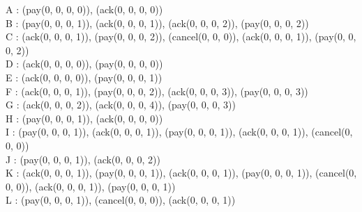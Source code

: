 \documentclass[a4paper]{article}
\begin{document}
\newpage
\noindent
A :  (pay(0, 0, 0, 0)), (ack(0, 0, 0, 0)) \\
B :  (pay(0, 0, 0, 1)), (ack(0, 0, 0, 1)), (ack(0, 0, 0, 2)), (pay(0, 0, 0, 2))\\
C :  (ack(0, 0, 0, 1)), (pay(0, 0, 0, 2)), (cancel(0, 0, 0)), (ack(0, 0, 0, 1)), (pay(0, 0, 0, 2))\\
D :  (ack(0, 0, 0, 0)), (pay(0, 0, 0, 0))\\
E :  (ack(0, 0, 0, 0)), (pay(0, 0, 0, 1))\\
F :  (ack(0, 0, 0, 1)), (pay(0, 0, 0, 2)), (ack(0, 0, 0, 3)), (pay(0, 0, 0, 3))\\
G :  (ack(0, 0, 0, 2)), (ack(0, 0, 0, 4)), (pay(0, 0, 0, 3))\\
H :  (pay(0, 0, 0, 1)), (ack(0, 0, 0, 0))\\
I :  (pay(0, 0, 0, 1)), (ack(0, 0, 0, 1)), (pay(0, 0, 0, 1)), (ack(0, 0, 0, 1)), (cancel(0, 0, 0))\\
J :  (pay(0, 0, 0, 1)), (ack(0, 0, 0, 2))\\
K :  (ack(0, 0, 0, 1)), (pay(0, 0, 0, 1)), (ack(0, 0, 0, 1)), (pay(0, 0, 0, 1)), (cancel(0, 0, 0)), (ack(0, 0, 0, 1)), (pay(0, 0, 0, 1))\\
L :  (pay(0, 0, 0, 1)), (cancel(0, 0, 0)), (ack(0, 0, 0, 1))\\
\end{document}
